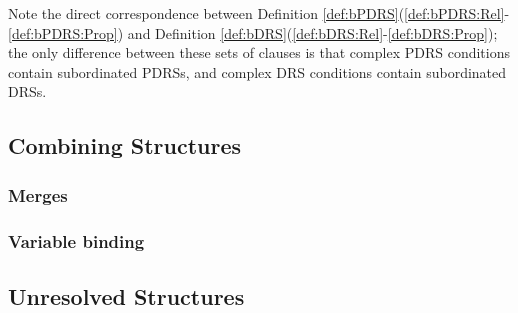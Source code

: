 \noindent Note the direct correspondence between Definition
\ref{def:bPDRS}(\ref{def:bPDRS:Rel}-\ref{def:bPDRS:Prop}) and Definition
\ref{def:bDRS}(\ref{def:bDRS:Rel}-\ref{def:bDRS:Prop}); the only difference
between these sets of clauses is that complex PDRS conditions contain
subordinated PDRSs, and complex DRS conditions contain subordinated DRSs.


\subsection{Combining Structures}

\subsubsection{Merges}

\subsubsection{Variable binding}

\subsection{Unresolved Structures}
